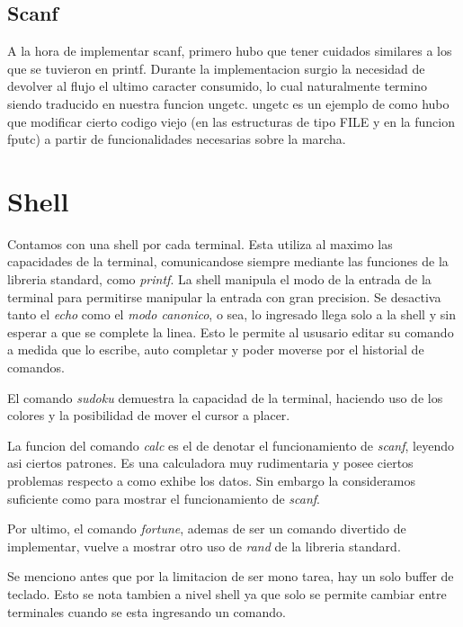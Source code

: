 \documentclass[a4paper,10pt]{article}
\begin{document}
    \subsection{Scanf}    
        A la hora de implementar scanf, primero hubo que tener cuidados similares a los que se tuvieron en printf. Durante la implementacion surgio la necesidad de devolver al flujo el ultimo caracter consumido, lo cual naturalmente termino siendo traducido en nuestra funcion ungetc. ungetc es un ejemplo de como hubo que modificar cierto codigo viejo (en las estructuras de tipo FILE y en la funcion fputc) a partir de funcionalidades necesarias sobre la marcha.

\section{Shell}
    Contamos con una shell por cada terminal.
    Esta utiliza al maximo las capacidades de la terminal, comunicandose siempre mediante las funciones de la libreria standard, como \textit{printf}.
    La shell manipula el modo de la entrada de la terminal para permitirse manipular la entrada con gran precision.
    Se desactiva tanto el \textit{echo} como el \textit{modo canonico}, o sea, lo ingresado llega solo a la shell y sin esperar a que se complete la linea.
    Esto le permite al ususario editar su comando a medida que lo escribe, auto completar y poder moverse por el historial de comandos.

    El comando \textit{sudoku} demuestra la capacidad de la terminal, haciendo uso de los colores y la posibilidad de mover el cursor a placer.
    
    La funcion del comando \textit{calc} es el de denotar el funcionamiento de \textit{scanf}, leyendo asi ciertos patrones.
    Es una calculadora muy rudimentaria y posee ciertos problemas respecto a como exhibe los datos.
    Sin embargo la consideramos suficiente como para mostrar el funcionamiento de \textit{scanf}.
    
    Por ultimo, el comando \textit{fortune}, ademas de ser un comando divertido de implementar, vuelve a mostrar otro uso de \textit{rand} de la libreria standard.

    Se menciono antes que por la limitacion de ser mono tarea, hay un solo buffer de teclado.
    Esto se nota tambien a nivel shell ya que solo se permite cambiar entre terminales cuando se esta ingresando un comando.
\end{document}
